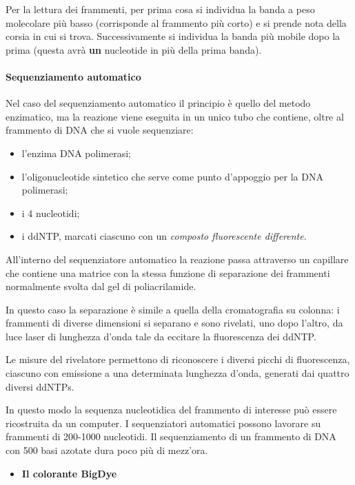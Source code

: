 \documentclass[]{article}
\begin{document}
Per la lettura dei frammenti, per prima cosa si individua la banda a
peso molecolare più basso (corrisponde al frammento più corto) e si
prende nota della corsia in cui si trova. Successivamente si individua
la banda più mobile dopo la prima (questa avrà \textbf{un} nucleotide in
più della prima banda).

\paragraph{Sequenziamento automatico}\label{sequenziamento-automatico}

Nel caso del sequenziamento automatico il principio è quello del metodo
enzimatico, ma la reazione viene eseguita in un unico tubo che contiene,
oltre al frammento di DNA che si vuole sequenziare:

\begin{itemize}
\itemsep1pt\parskip0pt
\item
  l'enzima DNA polimerasi;
\item
  l'oligonucleotide sintetico che serve come punto d'appoggio per la DNA
  polimerasi;
\item
  i 4 nucleotidi;
\item
  i ddNTP, marcati ciascuno con un \emph{composto fluorescente
  differente}.
\end{itemize}

All'interno del sequenziatore automatico la reazione passa attraverso un
capillare che contiene una matrice con la stessa funzione di separazione
dei frammenti normalmente svolta dal gel di poliacrilamide.

In questo caso la separazione è simile a quella della cromatografia su
colonna: i frammenti di diverse dimensioni si separano e sono rivelati,
uno dopo l'altro, da luce laser di lunghezza d'onda tale da eccitare la
fluorescenza dei ddNTP.

Le misure del rivelatore permettono di riconoscere i diversi picchi di
fluorescenza, ciascuno con emissione a una determinata lunghezza d'onda,
generati dai quattro diversi ddNTPs.

In questo modo la sequenza nucleotidica del frammento di interesse può
essere ricostruita da un computer. I sequenziatori automatici possono
lavorare su frammenti di 200-1000 nucleotidi. Il sequenziamento di un
frammento di DNA con 500 basi azotate dura poco più di mezz'ora.

\begin{itemize}
\itemsep1pt\parskip0pt
\item
  \textbf{Il colorante BigDye}
\end{itemize}
\end{document}
